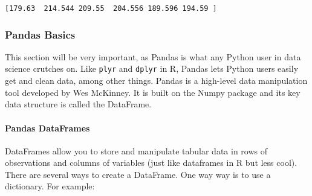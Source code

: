 \documentclass[11pt]{article}
\begin{document}
    \begin{Verbatim}[commandchars=\\\{\}]
[179.63  214.544 209.55  204.556 189.596 194.59 ]

    \end{Verbatim}

    \subsubsection{Pandas Basics}\label{pandas-basics}

This section will be very important, as Pandas is what any Python user
in data science crutches on. Like \texttt{plyr} and \texttt{dplyr} in R,
Pandas lets Python users easily get and clean data, among other things.
Pandas is a high-level data manipulation tool developed by Wes McKinney.
It is built on the Numpy package and its key data structure is called
the DataFrame.

\paragraph{Pandas DataFrames}\label{pandas-dataframes}

DataFrames allow you to store and manipulate tabular data in rows of
observations and columns of variables (just like dataframes in R but
less cool). There are several ways to create a DataFrame. One way way is
to use a dictionary. For example:
\end{document}
